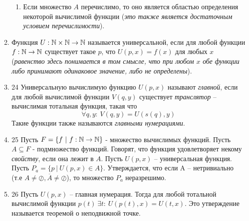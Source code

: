 \documentclass[a4paper,12pt]{article}
\begin{document}
\begin{enumerate}
\begin{enumerate}
            \item Если множество $A$ перечислимо, то оно является областью определения некоторой вычислимой функции (\textit{это также является достаточным условием перечислимости}).
        \end{enumerate}
        \item
        Функция $U:\mathbb{N}\times\mathbb{N}\to\mathbb{N}$ называется универсальной, если для любой функции $f: \mathbb{N}\to\mathbb{N}$ существует такое $p$, что $U(p, x)=f(x)$ для любых $x$ (\textit{равенство здесь понимается в том смысле, что при любом $x$ обе функции либо принимают одинаковое значение, либо не определены}).
        
		\item 24
		Универсальную вычислимую функцию $U(p, x)$ называют \textit{главной}, если для любой вычислимой функции $V(q, y)$ существует \textit{транслятор} -- вычислимая тотальная функция, такая что 
		\[
		\forall q, y: \ V(q, y) = U(s(q), y)
		\]
		Такие функции также называются \textit{главными нумерациями}.
		\item 25
		Пусть $F = \{ f \ | \ f : \mathbb{N} \rightarrow \mathbb{N} \}$ - множество вычислимых функций. Пусть $A \subseteq F$ - подмножество функций. Говорят, что функция удовлетворяет некому \textit{свойству}, если она лежит в $A$. Пусть $U(p, x)$ -- универсальная функция. Пусть $P_a = \{ p \ | \ U(p, x) \in A \}$. Утверждается, что если A -- нетривиально (т.е $A \neq \oslash, \overline{A} \neq \oslash$), то множество $P_a$ неразрешимо.
    	\item 26
        Пусть $U(p, x)$ -- главная нумерация. Тогда для любой тотальной вычислимой функции $p(t) \  \exists t: \ U(p(t), x) = U(t, x)$. Это утверждение называется теоремой о неподвижной точке.
	\end{enumerate}
		
	
\end{document}
